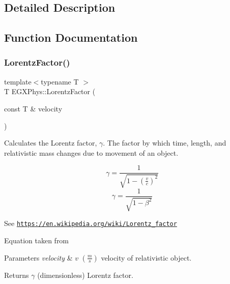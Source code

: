 \subsection{Detailed Description}


\subsection{Function Documentation}
\mbox{\label{group___relativity_ga5f9b11c1f4c3ae26a7e64f02c22d5a75}} 
\subsubsection{\texorpdfstring{Lorentz\+Factor()}{LorentzFactor()}}
{\footnotesize\ttfamily template$<$typename T $>$ \\
T E\+G\+X\+Phys\+::\+Lorentz\+Factor (\begin{DoxyParamCaption}\item[{const T \&}]{velocity }\end{DoxyParamCaption})}



Calculates the Lorentz factor, $\gamma$. The factor by which time, length, and relativistic mass changes due to movement of an object. 

\[\gamma=\frac{1}{\sqrt{1-(\frac{v}{c})^2}}\] \[\gamma=\frac{1}{\sqrt{1-\beta^2}}\]

See \href{https://en.wikipedia.org/wiki/Lorentz_factor}{\tt https\+://en.\+wikipedia.\+org/wiki/\+Lorentz\+\_\+factor}

Equation taken from


\begin{DoxyParams}{Parameters}
{\em velocity} & $v$ $(\frac{m}{s})$ velocity of relativistic object. \\
\hline
\end{DoxyParams}
\begin{DoxyReturn}{Returns}
$\gamma$ (dimensionless) Lorentz factor. 
\end{DoxyReturn}
\mbox{\label{group___relativity_ga601de8c039be89a9abea22bc459436c9}} 
